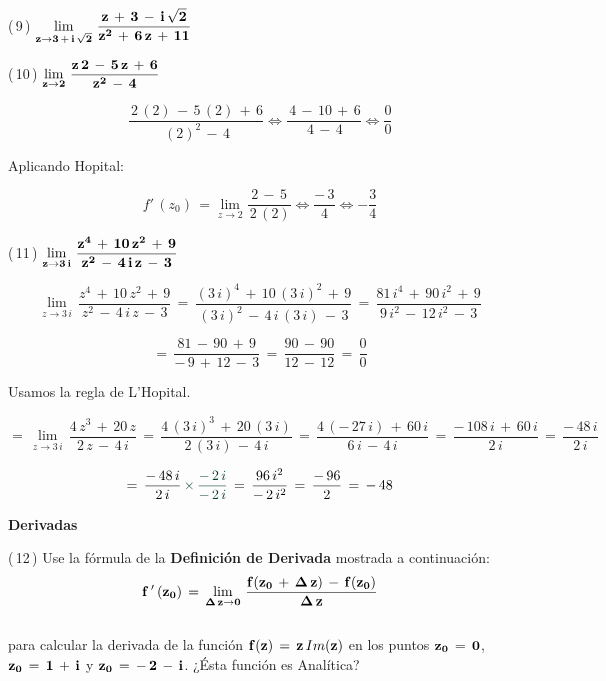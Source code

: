 \documentclass[a4paper,11pt,openany]{book}
\begin{document}
\textcolor{ao(english)}{(\,9\,)} $\bf{\displaystyle\lim_{z \to 3\,+\,i\,\sqrt{2}}\,\dfrac{z\,+\,3\,-\,i\,\sqrt{2}}{z^{2}\,+\,6\,z\,+\,11}}$

\textcolor{ao(english)}{(\,10\,)} $\bf{\displaystyle\lim_{z \to 2}\,\dfrac{z\,2\,-\,5\,z\,+\,6}{z^{2}\,-\,4}}$

$$ \dfrac{\,2\,(2)\,-\,5\,(2)\,+\,6}{\,(2)^{2}\,-\,4} \iff \dfrac{\,4\,-\,10\,+\,6}{\,4\,-\,4} \iff \dfrac{0}{0}$$

Aplicando Hopital:

$$ f'\,(z_{0})\,= \displaystyle\lim_{z \to 2} \dfrac{\,2\,-\,5\,}{\,2\,(2)} \iff \dfrac{-\,3}{4} \iff \boxed{-\dfrac{3}{4}}$$

\textcolor{ao(english)}{(\,11\,)} $\bf{\displaystyle\lim_{z \to 3\,i}\,\dfrac{z^{4}\,+\,10\,z^{2}\,+\,9}{z^{2}\,-\,4\,i\,z\,-\,3}}$

$$\displaystyle\lim_{z \to 3\,i}\,\dfrac{z^{4}\,+\,10\,z^{2}\,+\,9}{z^{2}\,-\,4\,i\,z\,-\,3}\,=\,\dfrac{(3\,i)^{4}\,+\,10\,(3\,i)^{2}\,+\,9}{(3\,i)^{2}\,-\,4\,i\,(3\,i)\,-\,3}\,=\,\dfrac{81\,i^{4}\,+\,90\,i^{2}\,+\,9}{9\,i^{2}\,-\,12\,i^{2}\,-\,3}$$

$$=\,\dfrac{81\,-\,90\,+\,9}{-\,9\,+\,12\,-\,3}\,=\,\dfrac{90\,-\,90}{12\,-\,12}\,=\,\dfrac{0}{0}$$

\textcolor{ao(english)}{} Usamos la regla de L'Hopital.


$$=\,\displaystyle\lim_{z \to 3\,i}\,\dfrac{4\,z^{3}\,+\,20\,z}{2\,z\,-\,4\,i}\,=\,\dfrac{4\,(3\,i)^{3}\,+\,20\,(3\,i)}{2\,(3\,i)\,-\,4\,i}\,=\,\dfrac{4\,(-\,27\,i)\,+\,60\,i}{6\,i\,-\,4\,i}\,=\,\dfrac{-\,108\,i\,+\,60\,i}{2\,i}\,=\,\dfrac{-\,48\,i}{2\,i}$$

$$=\,\dfrac{-\,48\,i}{2\,i}\,\textcolor{britishracinggreen}{\times\,\dfrac{-\,2\,i}{-\,2\,i}}\,=\,\dfrac{96\,i^{2}}{-\,2\,i^{2}}\,=\,\dfrac{-\,96}{2}\,=\,-\,48$$

\begin{center}
\textbf{Derivadas}
\end{center}

\textcolor{ao(english)}{(\,12\,)} Use la fórmula de la \textbf{Definición de Derivada} mostrada a continuación:\\

$$\bf{f\,'\,(z_{0})\,=\,\displaystyle\lim_{\Delta\,z \to 0}\,\dfrac{f(z_{0}\,+\,\Delta\,z)\,-\,f(z_{0})}{\Delta\,z}}$$\\

para calcular la derivada de la función $\bf{f(z)\,=\,z\,\mathnormal{Im}(z)}$ en los puntos $\bf{z_{0}\,=\,0}$, $\bf{z_{0}\,=\,1\,+\,i}$ y $\bf{z_{0}\,=\,-\,2\,-\,i}$. ¿Ésta función es Analítica?\\
\end{document}
